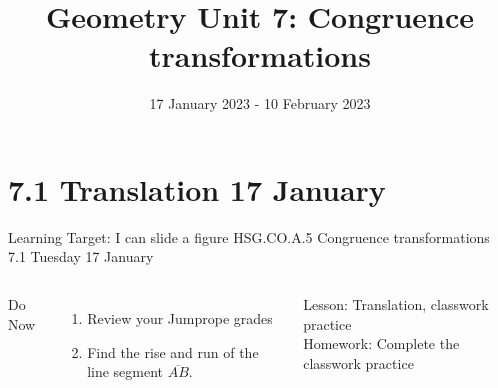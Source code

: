 

\newcommand\ticks{}
  \def\ticks{{Bar[scale=2]}-{Bar[scale=2]}}
\newcommand\paraticks{}
  \def\paraticks{{Straight Barb[reversed, scale=2]}-{Straight Barb[scale=2]}}

\title{Geometry Unit 7: Congruence transformations}
\date{17 January 2023 - 10 February 2023}


\frame{\titlepage}
\section[Outline]{}
\frame{\tableofcontents}

\section{7.1 Translation \hfill 17 January \,}
\begin{frame}{Learning Target: I can slide a figure}
  {HSG.CO.A.5 Congruence transformations \hfill \alert{7.1 Tuesday 17 January}}
  \begin{columns}
    Do Now
    \begin{enumerate}
      \item Review your Jumprope grades
      \item Find the rise and run of the line segment $\overline{AB}$.
    \end{enumerate}
    Lesson: Translation, classwork practice \\
    Homework: Complete the classwork practice
    \begin{flushright}
    \end{flushright}
  \end{columns}
\end{frame}

